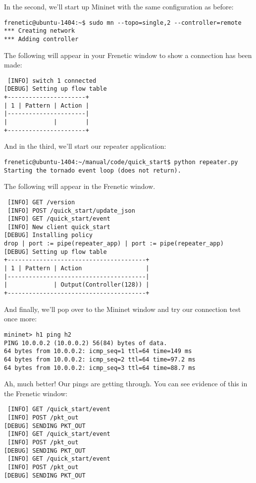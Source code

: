 In the second, we'll start up Mininet with the same configuration as before:

\begin{verbatim}
frenetic@ubuntu-1404:~$ sudo mn --topo=single,2 --controller=remote
*** Creating network
*** Adding controller
\end{verbatim}

The following will appear in your Frenetic window to show a connection has been made:

\begin{verbatim}
 [INFO] switch 1 connected
[DEBUG] Setting up flow table
+----------------------+
| 1 | Pattern | Action |
|----------------------|
|             |        |
+----------------------+
\end{verbatim}

And in the third, we'll start our repeater application:

\begin{verbatim}
frenetic@ubuntu-1404:~/manual/code/quick_start$ python repeater.py
Starting the tornado event loop (does not return).
\end{verbatim}

The following will appear in the Frenetic window.  

\begin{verbatim}
 [INFO] GET /version
 [INFO] POST /quick_start/update_json
 [INFO] GET /quick_start/event
 [INFO] New client quick_start
[DEBUG] Installing policy
drop | port := pipe(repeater_app) | port := pipe(repeater_app)
[DEBUG] Setting up flow table
+---------------------------------------+
| 1 | Pattern | Action                  |
|---------------------------------------|
|             | Output(Controller(128)) |
+---------------------------------------+
\end{verbatim}

And finally, we'll pop over to the Mininet window and try our connection test once more:

\begin{verbatim}
mininet> h1 ping h2
PING 10.0.0.2 (10.0.0.2) 56(84) bytes of data.
64 bytes from 10.0.0.2: icmp_seq=1 ttl=64 time=149 ms
64 bytes from 10.0.0.2: icmp_seq=2 ttl=64 time=97.2 ms
64 bytes from 10.0.0.2: icmp_seq=3 ttl=64 time=88.7 ms
\end{verbatim}

Ah, much better! 
Our pings are getting through.  
You can see evidence of this in the Frenetic window:

\begin{verbatim}
 [INFO] GET /quick_start/event
 [INFO] POST /pkt_out
[DEBUG] SENDING PKT_OUT
 [INFO] GET /quick_start/event
 [INFO] POST /pkt_out
[DEBUG] SENDING PKT_OUT
 [INFO] GET /quick_start/event
 [INFO] POST /pkt_out
[DEBUG] SENDING PKT_OUT
\end{verbatim}


